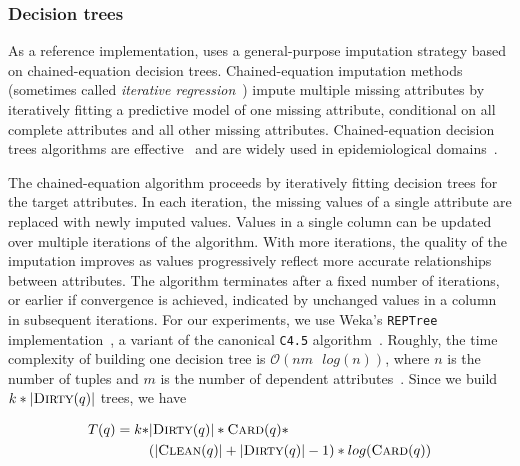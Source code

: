 {\subsubsection{Decision trees}

As a reference implementation,
\ProjectName{} uses a general-purpose imputation strategy based on
chained-equation decision trees.  Chained-equation imputation
methods~\cite{vanbuuren2011mice} (sometimes called \textit{iterative
regression}~\cite{gelman2006data}) impute multiple missing attributes by
iteratively fitting a predictive model of one missing attribute, conditional on
all complete attributes and all other missing attributes. Chained-equation
decision trees algorithms are effective~\cite{akande2015empirical}
and are widely used in epidemiological domains~\cite{burgette2010multiple}.


The chained-equation algorithm proceeds by
iteratively fitting decision trees for the target attributes. 
In each iteration, the missing values of a single attribute are replaced with newly imputed values.  Values in a single column can be updated over multiple
iterations of the algorithm. With more iterations, the quality of the
imputation improves as values progressively reflect more accurate relationships
between attributes. The algorithm terminates after a fixed number of
iterations, or earlier if convergence is achieved, indicated by unchanged values in a 
column in subsequent iterations. For our experiments, we use Weka's \texttt{REPTree}
implementation~\cite{witten2016data}, a variant of the canonical \texttt{C4.5}
algorithm~\cite{quinlan1993}. Roughly, the time complexity of building one
decision tree is $\mathcal{O}(nm \text{ } log(n))$, where $n$ is the number of tuples
and $m$ is the number of dependent attributes~\cite{witten2016data}. Since we build
$k * |\textsc{Dirty}(q)|$ trees, we have

\begin{equation*}
    \begin{aligned}
    T(q) = k * &|\textsc{Dirty}(q)| * \textsc{Card}(q) * \\
               &(|\textsc{Clean}(q)| + |\textsc{Dirty}(q)| - 1) * log(\textsc{Card}(q))
    \end{aligned}
\end{equation*}

}
